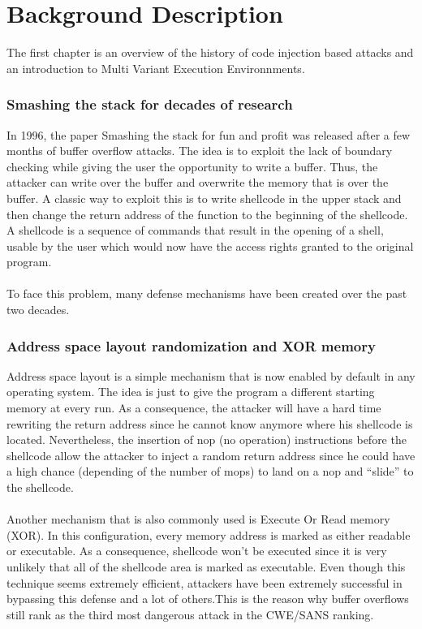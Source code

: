 \documentclass[english]{enstaPRE}
\begin{document}
\part{Background Description}
The first chapter is an overview of the history of code injection based attacks and an introduction to Multi Variant Execution Environnments.

\section{Smashing the stack for decades of research}
In 1996, the paper Smashing the stack for fun and profit \cite{smashing} was released after a few months of buffer overflow attacks.
The idea is to exploit the lack of boundary checking while giving the user the opportunity to write a buffer.
Thus, the attacker can write over the buffer and overwrite the memory that is over the buffer. 
A classic way to exploit this is to write shellcode in the upper stack and then change the return address of the function
to the beginning of the shellcode. A shellcode is a sequence of commands that result in the opening of a shell, usable by the user which
would now have the access rights granted to the original program.\\
 \\

To face this problem, many defense mechanisms have been created over the past two decades.

\section{Address space layout randomization and XOR memory}
Address space layout is a simple mechanism that is now enabled by default in any operating system. The idea is just to give the 
program a different starting memory at every run. As a consequence, the attacker will have a hard time rewriting the return address since
he cannot know anymore where his shellcode is located. 
Nevertheless, the insertion of nop (no operation) instructions before the shellcode allow the attacker to inject a random 
return address since he could have a high chance (depending of the number of mops) to land on a nop and ``slide'' to the shellcode.
\\ \\
Another mechanism that is also commonly used is Execute Or Read memory (XOR). In this configuration, every memory address is marked
as either readable or executable. As a consequence, shellcode won't be executed since it is very unlikely that all of the shellcode
area is marked as executable.
Even though this technique seems extremely efficient, attackers have been extremely successful in bypassing this defense 
and a lot of others.This is the reason why buffer overflows still rank as the third most dangerous attack in the CWE/SANS ranking.\\
 \\
\end{document}
